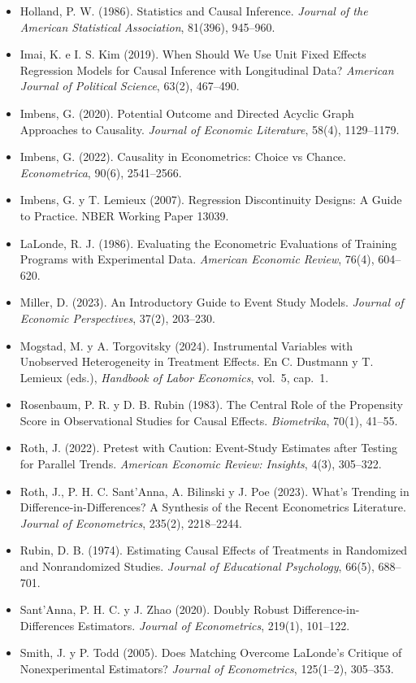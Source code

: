 \documentclass[11pt,a4paper]{article}
\begin{document}
{\begin{itemize}[leftmargin=1.4em,itemsep=1pt,label={}]
\item Holland, P. W. (1986). Statistics and Causal Inference. \emph{Journal of the American Statistical Association}, 81(396), 945--960.
\item Imai, K. e I. S. Kim (2019). When Should We Use Unit Fixed Effects Regression Models for Causal Inference with Longitudinal Data? \emph{American Journal of Political Science}, 63(2), 467--490.
\item Imbens, G. (2020). Potential Outcome and Directed Acyclic Graph Approaches to Causality. \emph{Journal of Economic Literature}, 58(4), 1129--1179.
\item Imbens, G. (2022). Causality in Econometrics: Choice vs Chance. \emph{Econometrica}, 90(6), 2541--2566.
\item Imbens, G. y T. Lemieux (2007). Regression Discontinuity Designs: A Guide to Practice. NBER Working Paper 13039.
\item LaLonde, R. J. (1986). Evaluating the Econometric Evaluations of Training Programs with Experimental Data. \emph{American Economic Review}, 76(4), 604--620.
\item Miller, D. (2023). An Introductory Guide to Event Study Models. \emph{Journal of Economic Perspectives}, 37(2), 203--230.
\item Mogstad, M. y A. Torgovitsky (2024). Instrumental Variables with Unobserved Heterogeneity in Treatment Effects. En C. Dustmann y T. Lemieux (eds.), \emph{Handbook of Labor Economics}, vol.~5, cap.~1.
\item Rosenbaum, P. R. y D. B. Rubin (1983). The Central Role of the Propensity Score in Observational Studies for Causal Effects. \emph{Biometrika}, 70(1), 41--55.
\item Roth, J. (2022). Pretest with Caution: Event-Study Estimates after Testing for Parallel Trends. \emph{American Economic Review: Insights}, 4(3), 305--322.
\item Roth, J., P. H. C. Sant'Anna, A. Bilinski y J. Poe (2023). What's Trending in Difference-in-Differences? A Synthesis of the Recent Econometrics Literature. \emph{Journal of Econometrics}, 235(2), 2218--2244.
\item Rubin, D. B. (1974). Estimating Causal Effects of Treatments in Randomized and Nonrandomized Studies. \emph{Journal of Educational Psychology}, 66(5), 688--701.
\item Sant'Anna, P. H. C. y J. Zhao (2020). Doubly Robust Difference-in-Differences Estimators. \emph{Journal of Econometrics}, 219(1), 101--122.
\item Smith, J. y P. Todd (2005). Does Matching Overcome LaLonde's Critique of Nonexperimental Estimators? \emph{Journal of Econometrics}, 125(1--2), 305--353.

\end{itemize}}
\end{document}
